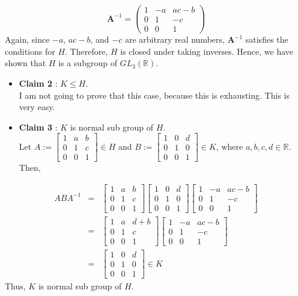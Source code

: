 \documentclass[
]{book}
\begin{document}
\[ \mathbf{A}^{-1} = \begin{pmatrix} 1 & -a & ac-b \\ 0 & 1 & -c \\ 0 & 0 & 1 \end{pmatrix} \]
Again, since \(-a\), \(ac-b\), and \(-c\) are arbitrary real numbers,
\(\mathbf{A}^{-1}\) satisfies the conditions for \(H\). Therefore, \(H\)
is closed under taking inverses. Hence, we have shown that \(H\) is a
subgroup of \(GL_3(\mathbb{R})\).

\begin{itemize}
\item
  \textbf{Claim 2} : \(K\leq H\).\\
  I am not going to prove that this case, because this is exhausting.
  This is very easy.
\item
  \textbf{Claim 3} : \(K\) is normal sub group of \(H\).\\
  Let
  \(A:=\begin{bmatrix} 1 & a & b \\0 & 1 & c\\ 0 & 0 & 1\end{bmatrix}\in H\)
  and
  \(B:=\begin{bmatrix} 1 & 0 & d \\0 & 1 & 0\\ 0 & 0 & 1\end{bmatrix}\in K\),
  where \(a,b,c,d\in \mathbb{R}\). Then,
\end{itemize}

\begin{eqnarray}
ABA^{-1}& =& \begin{bmatrix} 1 & a & b \\0 & 1 & c\\ 0 & 0  & 1\end{bmatrix}
\begin{bmatrix} 1 & 0 & d \\0 & 1 & 0\\ 0 & 0  & 1\end{bmatrix}
\begin{bmatrix} 1 & -a & ac-b \\ 0 & 1 & -c \\ 0 & 0 & 1 \end{bmatrix} \\
&=&\begin{bmatrix} 1 & a & d+b \\0 & 1 & c\\ 0 & 0  & 1\end{bmatrix}
\begin{bmatrix} 1 & -a & ac-b \\ 0 & 1 & -c \\ 0 & 0 & 1 \end{bmatrix} \\ 
&=& \begin{bmatrix} 1 & 0 & d \\0 & 1 & 0\\ 0 & 0  & 1\end{bmatrix}\in K
\end{eqnarray} Thus, \(K\) is normal sub group of \(H\).
\end{document}
